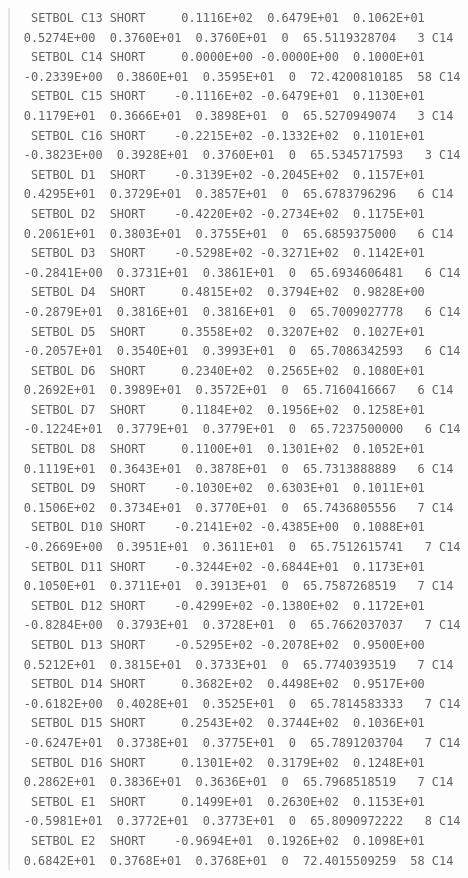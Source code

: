 \documentclass[twoside,11pt]{article}
\newenvironment{myquote}{\begin{quote}\begin{small}}{\end{small}\end{quote}}
\renewcommand{\_}{\texttt{\symbol{95}}}
\begin{document}
\begin{landscape}
\begin{myquote}
\begin{verbatim}
 SETBOL C13 SHORT     0.1116E+02  0.6479E+01  0.1062E+01  0.5274E+00  0.3760E+01  0.3760E+01  0  65.5119328704   3 C14
 SETBOL C14 SHORT     0.0000E+00 -0.0000E+00  0.1000E+01 -0.2339E+00  0.3860E+01  0.3595E+01  0  72.4200810185  58 C14
 SETBOL C15 SHORT    -0.1116E+02 -0.6479E+01  0.1130E+01  0.1179E+01  0.3666E+01  0.3898E+01  0  65.5270949074   3 C14
 SETBOL C16 SHORT    -0.2215E+02 -0.1332E+02  0.1101E+01 -0.3823E+00  0.3928E+01  0.3760E+01  0  65.5345717593   3 C14
 SETBOL D1  SHORT    -0.3139E+02 -0.2045E+02  0.1157E+01  0.4295E+01  0.3729E+01  0.3857E+01  0  65.6783796296   6 C14
 SETBOL D2  SHORT    -0.4220E+02 -0.2734E+02  0.1175E+01  0.2061E+01  0.3803E+01  0.3755E+01  0  65.6859375000   6 C14
 SETBOL D3  SHORT    -0.5298E+02 -0.3271E+02  0.1142E+01 -0.2841E+00  0.3731E+01  0.3861E+01  0  65.6934606481   6 C14
 SETBOL D4  SHORT     0.4815E+02  0.3794E+02  0.9828E+00 -0.2879E+01  0.3816E+01  0.3816E+01  0  65.7009027778   6 C14
 SETBOL D5  SHORT     0.3558E+02  0.3207E+02  0.1027E+01 -0.2057E+01  0.3540E+01  0.3993E+01  0  65.7086342593   6 C14
 SETBOL D6  SHORT     0.2340E+02  0.2565E+02  0.1080E+01  0.2692E+01  0.3989E+01  0.3572E+01  0  65.7160416667   6 C14
 SETBOL D7  SHORT     0.1184E+02  0.1956E+02  0.1258E+01 -0.1224E+01  0.3779E+01  0.3779E+01  0  65.7237500000   6 C14
 SETBOL D8  SHORT     0.1100E+01  0.1301E+02  0.1052E+01  0.1119E+01  0.3643E+01  0.3878E+01  0  65.7313888889   6 C14
 SETBOL D9  SHORT    -0.1030E+02  0.6303E+01  0.1011E+01  0.1506E+02  0.3734E+01  0.3770E+01  0  65.7436805556   7 C14
 SETBOL D10 SHORT    -0.2141E+02 -0.4385E+00  0.1088E+01 -0.2669E+00  0.3951E+01  0.3611E+01  0  65.7512615741   7 C14
 SETBOL D11 SHORT    -0.3244E+02 -0.6844E+01  0.1173E+01  0.1050E+01  0.3711E+01  0.3913E+01  0  65.7587268519   7 C14
 SETBOL D12 SHORT    -0.4299E+02 -0.1380E+02  0.1172E+01 -0.8284E+00  0.3793E+01  0.3728E+01  0  65.7662037037   7 C14
 SETBOL D13 SHORT    -0.5295E+02 -0.2078E+02  0.9500E+00  0.5212E+01  0.3815E+01  0.3733E+01  0  65.7740393519   7 C14
 SETBOL D14 SHORT     0.3682E+02  0.4498E+02  0.9517E+00 -0.6182E+00  0.4028E+01  0.3525E+01  0  65.7814583333   7 C14
 SETBOL D15 SHORT     0.2543E+02  0.3744E+02  0.1036E+01 -0.6247E+01  0.3738E+01  0.3775E+01  0  65.7891203704   7 C14
 SETBOL D16 SHORT     0.1301E+02  0.3179E+02  0.1248E+01  0.2862E+01  0.3836E+01  0.3636E+01  0  65.7968518519   7 C14
 SETBOL E1  SHORT     0.1499E+01  0.2630E+02  0.1153E+01 -0.5981E+01  0.3772E+01  0.3773E+01  0  65.8090972222   8 C14
 SETBOL E2  SHORT    -0.9694E+01  0.1926E+02  0.1098E+01  0.6842E+01  0.3768E+01  0.3768E+01  0  72.4015509259  58 C14

\end{verbatim}
\end{myquote}
\end{landscape}
\end{document}
